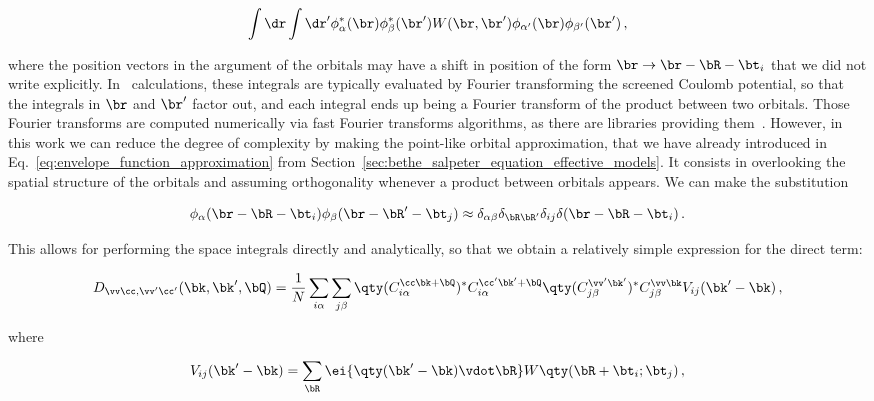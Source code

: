 \begin{equation}
    \int \dr \int \dr' \phi^*_{\alpha} (\br) \phi^*_{\beta} (\br') W(\br,\br') \phi_{\alpha'} (\br) \phi_{\beta'} (\br')\,,
\end{equation}

\noindent where the position vectors in the argument of the orbitals may have a shift in position of the form $\br \to \br - \bR - \bt_i$ that we did not write explicitly.
In \abinit~calculations, these integrals are typically evaluated by Fourier transforming the screened Coulomb potential, so that the integrals in $\br$ and $\br'$ factor out, and each integral ends up being a Fourier transform of the product between two orbitals.
Those Fourier transforms are computed numerically via fast Fourier transforms algorithms, as there are libraries providing them~\cite{FFTW05}.
However, in this work we can reduce the degree of complexity by making the point-like orbital approximation, that we have already introduced in Eq.~\eqref{eq:envelope_function_approximation} from Section~\ref{sec:bethe_salpeter_equation_effective_models}.
It consists in overlooking the spatial structure of the orbitals and assuming orthogonality whenever a product between orbitals appears.
We can make the substitution

\begin{equation}
    \label{eq:point-like_orbital_approximation}
    \phi_{\alpha} (\br - \bR - \bt_{i}) \phi_{\beta} (\br - \bR' - \bt_j) \approx \delta_{\alpha \beta} \delta_{\bR \bR'} \delta_{ij} \delta(\br - \bR - \bt_i)\,.
\end{equation}

\noindent This allows for performing the space integrals directly and analytically, so that we obtain a relatively simple expression for the direct term:

\begin{equation}
    D_{\vv \cc , \vv ' \cc '}(\bk,\bk',\bQ) = \frac{1}{N} \sum_{i \alpha}  \sum_{j \beta} \qty(C_{i \alpha}^{\cc  \bk+ \bQ})^* C_{i \alpha}^{\cc ' \bk' + \bQ} \qty(C_{j \beta}^{\vv ' \bk'})^* C_{j \beta}^{\vv \bk} V_{ij}(\bk' - \bk)\,,
    \label{eq:interaction_matrix_element_direct_real_space}
\end{equation}

\noindent where

\begin{equation}
    V_{ij}(\bk' - \bk) = \sum_{\bR} \ei{\qty(\bk' - \bk) \vdot \bR} W\qty(\bR + \bt_i; \bt_j)\,,
\end{equation}


